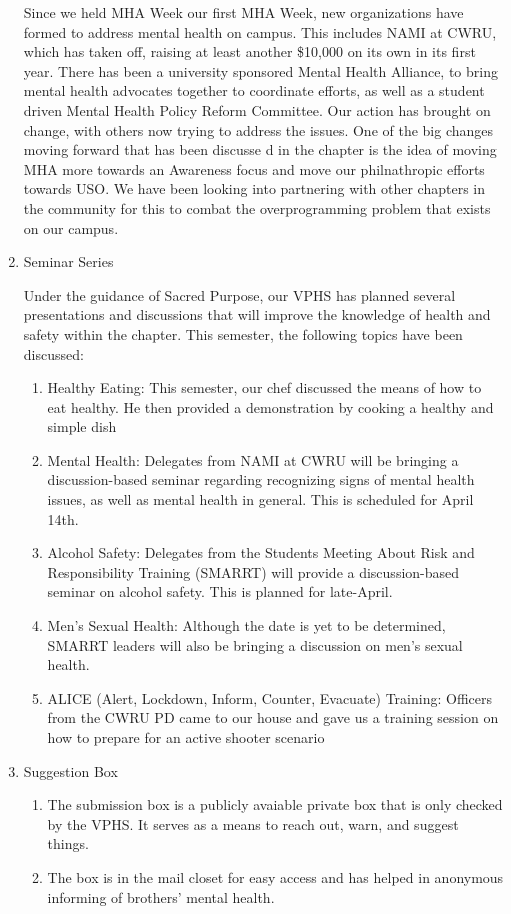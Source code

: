 \begin{enumerate}
  	Since we held MHA Week our first MHA Week, new organizations have formed to address mental health on campus. This includes NAMI at CWRU, which has taken off, raising at least another \$10,000 on its own in its first year. There has been a university sponsored Mental Health Alliance, to bring mental health advocates together to coordinate efforts, as well as a student driven Mental Health Policy Reform Committee. Our action has brought on change, with others now trying to address the issues. One of the big changes moving forward that has been discusse d in the chapter is the idea of moving MHA more towards an Awareness focus and move our philnathropic efforts towards USO. We have been looking into partnering with other chapters in the community for this to combat the overprogramming problem that exists on our campus. 
  	
    \item Seminar Series
    
	  Under the guidance of Sacred Purpose, our VPHS has planned several presentations and discussions that will improve the knowledge of health and safety within the chapter. This semester, the following topics have been discussed:	
	  \begin{enumerate}
	    \item Healthy Eating: This semester, our chef discussed the means of how to eat healthy. He then provided a demonstration by cooking a healthy and simple dish
	    \item Mental Health: Delegates from NAMI at CWRU will be bringing a discussion-based seminar regarding recognizing signs of mental health issues, as well as mental health in general. This is scheduled for April 14th.
	    \item Alcohol Safety: Delegates from the Students Meeting About Risk and Responsibility Training (SMARRT) will provide a discussion-based seminar on alcohol safety. This is planned for late-April.
	    \item Men's Sexual Health: Although the date is yet to be determined, SMARRT leaders will also be bringing a discussion on men's sexual health.
	    \item ALICE (Alert, Lockdown, Inform, Counter, Evacuate) Training: Officers from the CWRU PD came to our house and gave us a training session on how to prepare for an active shooter scenario
	\end{enumerate}
	\item Suggestion Box
		\begin{enumerate}
			\item The submission box is a publicly avaiable private box that is only checked by the VPHS. It serves as a means to reach out, warn, and suggest things.
			\item The box is in the mail closet for easy access and has helped in anonymous informing of brothers' mental health.
		\end{enumerate}
 \end{enumerate}